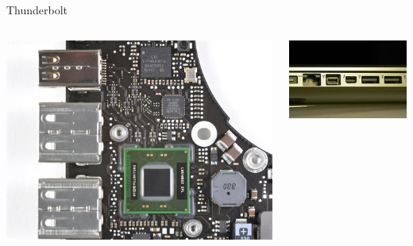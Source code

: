 \documentclass[aspectratio=43]{beamer}
\begin{document}
\begin{frame}{Thunderbolt}
	\begin{center}
		  
		\begin{columns}
			\begin{center}
				\includegraphics[width=1\linewidth]{extrahovane_obrazky/img_4_page6_3.jpeg}
			\end{center}
			\begin{center}
				\includegraphics[width=1\linewidth]{extrahovane_obrazky/img_4_page6_4.jpeg}
			\end{center}
		\end{columns}
		
	\end{center}
	
\end{frame}
\end{document}
